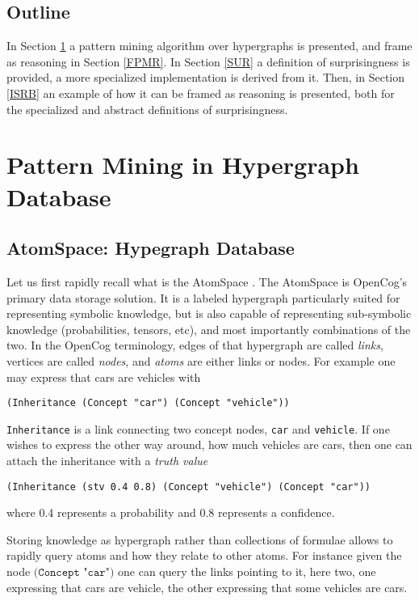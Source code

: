 \documentclass[runningheads]{llncs}
\begin{document}
\subsection{Outline}

In Section \ref{PMHD} a pattern mining algorithm over hypergraphs is
presented, and frame as reasoning in Section \ref{FPMR}. In Section
\ref{SUR} a definition of surprisingness is provided, a more
specialized implementation is derived from it. Then, in Section
\ref{ISRB} an example of how it can be framed as reasoning is
presented, both for the specialized and abstract definitions of
surprisingness.

\section{Pattern Mining in Hypergraph Database}
\label{PMHD}

\subsection{AtomSpace: Hypegraph Database}

Let us first rapidly recall what is the AtomSpace
\cite{Goertzel2014}. The AtomSpace is OpenCog's primary data storage
solution. It is a labeled hypergraph particularly suited for
representing symbolic knowledge, but is also capable of representing
sub-symbolic knowledge (probabilities, tensors, etc), and most
importantly combinations of the two. In the OpenCog terminology, edges
of that hypergraph are called \emph{links}, vertices are called
\emph{nodes}, and \emph{atoms} are either links or nodes.  For example
one may express that cars are vehicles with
\begin{verbatim}
(Inheritance (Concept "car") (Concept "vehicle"))
\end{verbatim}
\texttt{Inheritance} is a link connecting two concept nodes,
\texttt{car} and \texttt{vehicle}.  If one wishes to express the other
way around, how much vehicles are cars, then one can attach the
inheritance with a \emph{truth value}
\begin{verbatim}
(Inheritance (stv 0.4 0.8) (Concept "vehicle") (Concept "car"))
\end{verbatim}
where 0.4 represents a probability and 0.8 represents a confidence.

Storing knowledge as hypergraph rather than collections of formulae
allows to rapidly query atoms and how they relate to other atoms. For
instance given the node $\texttt{(Concept "car")}$ one can query the
links pointing to it, here two, one expressing that cars are vehicle,
the other expressing that some vehicles are cars.
\end{document}
